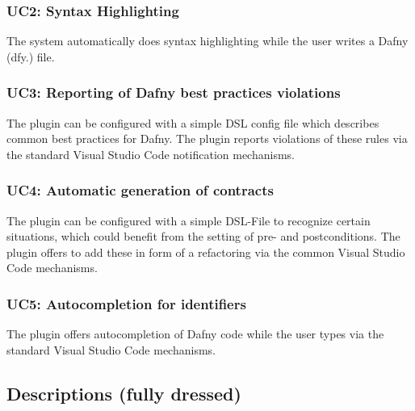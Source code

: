 \subsubsection{UC2: Syntax Highlighting}
The system automatically does syntax highlighting while the user writes a Dafny (dfy.) file.
\subsubsection{UC3: Reporting of Dafny best practices violations}
The plugin can be configured with a simple DSL config file which describes common best practices for Dafny. The plugin reports violations of these rules via the standard Visual Studio Code notification mechanisms.
\subsubsection{UC4: Automatic generation of contracts}
The plugin can be configured with a simple DSL-File to recognize certain situations, which could benefit from the setting of pre- and postconditions. The plugin offers to add these in form of a refactoring via the common Visual Studio Code mechanisms.

\subsubsection{UC5: Autocompletion for identifiers}
The plugin offers autocompletion of Dafny code while the user types via the standard Visual Studio Code mechanisms.
\subsection{Descriptions (fully dressed)}

